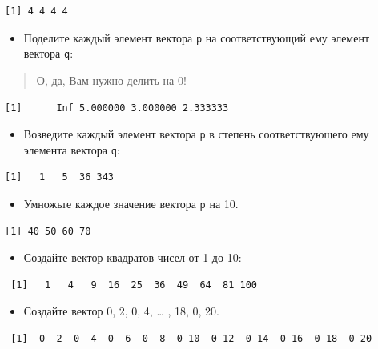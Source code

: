 \documentclass[
]{book}
\providecommand{\tightlist}{%
  \setlength{\itemsep}{0pt}\setlength{\parskip}{0pt}}
\begin{document}
\begin{verbatim}
[1] 4 4 4 4
\end{verbatim}

\begin{itemize}
\tightlist
\item
  Поделите каждый элемент вектора \texttt{p} на соответствующий ему элемент вектора \texttt{q}:
\end{itemize}

\begin{quote}
О, да, Вам нужно делить на 0!
\end{quote}

\begin{verbatim}
[1]      Inf 5.000000 3.000000 2.333333
\end{verbatim}

\begin{itemize}
\tightlist
\item
  Возведите каждый элемент вектора \texttt{p} в степень соответствующего ему элемента вектора \texttt{q}:
\end{itemize}

\begin{verbatim}
[1]   1   5  36 343
\end{verbatim}

\begin{itemize}
\tightlist
\item
  Умножьте каждое значение вектора \texttt{p} на 10.
\end{itemize}

\begin{verbatim}
[1] 40 50 60 70
\end{verbatim}

\begin{itemize}
\tightlist
\item
  Создайте вектор квадратов чисел от 1 до 10:
\end{itemize}

\begin{verbatim}
 [1]   1   4   9  16  25  36  49  64  81 100
\end{verbatim}

\begin{itemize}
\tightlist
\item
  Создайте вектор 0, 2, 0, 4, \ldots{} , 18, 0, 20.
\end{itemize}

\begin{verbatim}
 [1]  0  2  0  4  0  6  0  8  0 10  0 12  0 14  0 16  0 18  0 20
\end{verbatim}
\end{document}
